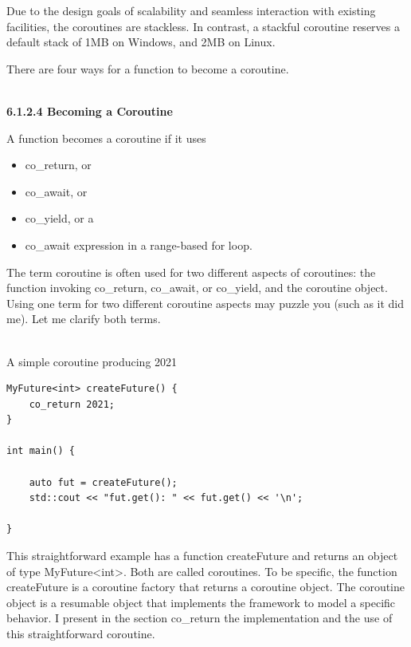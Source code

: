 Due to the design goals of scalability and seamless interaction with existing facilities, the coroutines are stackless. In contrast, a stackful coroutine reserves a default stack of 1MB on Windows, and 2MB on Linux.

There are four ways for a function to become a coroutine.

\hspace*{\fill} \\ %
\noindent
\textbf{6.1.2.4\hspace{0.2cm} Becoming a Coroutine}

A function becomes a coroutine if it uses

\begin{itemize}
\item 
co\_return, or

\item 
co\_await, or

\item 
co\_yield, or a

\item 
co\_await expression in a range-based for loop.
\end{itemize}

\begin{tcolorbox}[breakable,enhanced jigsaw,colback=red!5!white,colframe=red!75!black,title={Distinguish Between the Coroutine Factory and the Coroutine Object}]
	
The term coroutine is often used for two different aspects of coroutines: the function invoking co\_return, co\_await, or co\_yield, and the coroutine object. Using one term for two different coroutine aspects may puzzle you (such as it did me). Let me clarify both terms.

\hspace*{\fill} \\ %
\noindent
A simple coroutine producing 2021
\begin{lstlisting}[style=styleCXX]
MyFuture<int> createFuture() {
	co_return 2021;
}

int main() {
	
	auto fut = createFuture();
	std::cout << "fut.get(): " << fut.get() << '\n';
	
}
\end{lstlisting}

This straightforward example has a function createFuture and returns an object of type MyFuture<int>. Both are called coroutines. To be specific, the function createFuture is a coroutine factory that returns a coroutine object. The coroutine object is a resumable object that implements the framework to model a specific behavior. I present in the section co\_return the implementation and the use of this straightforward coroutine.
	
\end{tcolorbox}

